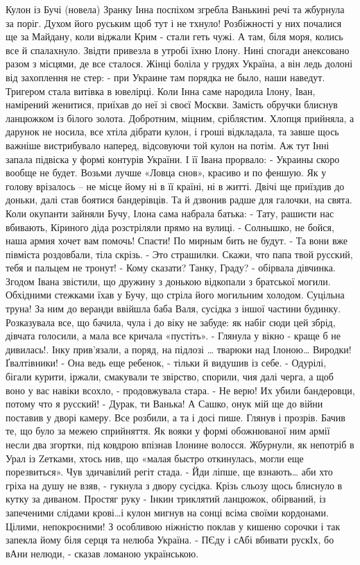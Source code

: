 \obeycr
Кулон із Бучі
(новела)
Зранку Інна поспіхом згребла Ванькині речі та жбурнула за поріг. Духом його руським щоб тут і не тхнуло! Розбіжності у них почалися ще за Майдану, коли віджали Крим - стали геть чужі. А там, біля моря, колись все й спалахнуло. Звідти привезла в утробі їхню Ілону. Нині спогади анексовано разом з місцями, де все сталося. Жінці боліла у грудях Україна, а він ледь долоні від захоплення не стер:
- при Украине там порядка не было, наши наведут.
Тригером стала витівка в ювелірці.
Коли Інна саме народила Ілону, Іван, намірений женитися, приїхав до неї зі своєї Москви. Замість обручки блиснув ланцюжком із білого золота. Добротним, міцним, сріблястим. Хлопця прийняла, а дарунок не носила, все хтіла дібрати кулон, і гроші відкладала, та завше щось важніше вистрибувало наперед, відсовуючи той кулон на потім. Аж тут Інні запала підвіска у формі контурів України. І її Івана прорвало:
- Украины скоро вообще не будет. Возьми лучше «Ловца снов», красиво и по феншую.
Як у голову врізалось – не місце йому ні в її країні, ні в житті.
Двічі ще приїздив до доньки, далі став боятися бандерівців. Та й дзвонив радше для галочки, на свята.
Коли окупанти зайняли Бучу, Ілона сама набрала батька:
- Тату, рашисти нас вбивають, Кіриного діда розстріляли прямо на вулиці.
- Солнышко, не бойся, наша армия хочет вам помочь! Спасти! По мирным бить не будут.
- Та вони вже півміста роздовбали, тіла скрізь.
- Это страшилки. Скажи, что папа твой русский, тебя и пальцем не тронут!
- Кому сказати? Танку, Граду? - обірвала дівчинка.
Згодом Івана звістили, що дружину з донькою відкопали з братської могили. Обхідними стежками їхав у Бучу, що стріла його могильним холодом. Суцільна труна!
За ним до веранди ввійшла баба Валя, сусідка з іншої частини будинку. Розказувала все, що бачила, чула і до віку не забуде: як набіг сюди цей збрід, дівчата голосили, а мала все кричала «пустіть».
- Глянула у вікно - краще б не дивилась!. Інку прив'язали, а поряд, на підлозі … тварюки над Ілоною… Виродки! Ґвалтівники!
- Она ведь еще ребенок, - тільки й видушив із себе.
- Одурілі, бігали курити, іржали, смакували те звірство, спорили, чия далі черга, а щоб воно у вас навіки всохло, - продовжувала стара.
- Не верю! Их убили бандеровци, потому что я русский!
- Дурак, ти Ванька! А Сашко, онук мій ще до війни поставив у дворі камеру. Все розбили, а та і досі пише.
Глянув і прозрів. Бачив те, що було за межею сприйняття. Як вояки у формі обожнюваної ним армії несли два згортки, під ковдрою впізнав Ілонине волосся. Жбурнули, як непотріб в Урал із Zетками, хтось нив, що «малая быстро откинулась, могли еще порезвиться». Чув здичавілий регіт стада.
- Йди ліпше, ще взнають… аби хто гріха на душу не взяв, - гукнула з двору сусідка.
Крізь сльозу щось блиснуло в кутку за диваном. Простяг руку - Інкин триклятий ланцюжок, обірваний, із запеченими слідами крові…і кулон мигнув на сонці всіма своїми кордонами. Цілими, непокроєними! З особливою ніжністю поклав у кишеню сорочки і так запекла йому біля серця та нелюба Україна.
- ПЄду і сАбі вбивати рускІх, бо вАни нелюди, - сказав ломаною українською.
\restorecr

